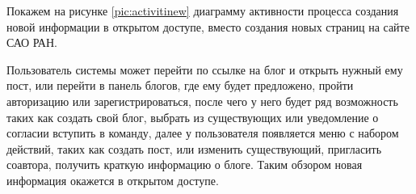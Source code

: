 \pagebreak
Покажем на рисунке \ref{pic:activitinew} диаграмму активности процесса создания новой информации в открытом доступе, вместо создания новых страниц на сайте САО РАН.


Пользователь системы может перейти по ссылке на блог и открыть нужный ему пост, или перейти в панель блогов, где ему будет предложено, пройти авторизацию или зарегистрироваться, после чего у него будет ряд возможность таких как создать свой блог, выбрать из существующих или уведомление о согласии вступить в команду, далее у пользователя появляется меню с набором действий, таких как создать пост, или изменить существующий, пригласить соавтора, получить краткую информацию о блоге. Таким обзором новая информация окажется в открытом доступе.   



\pagebreak